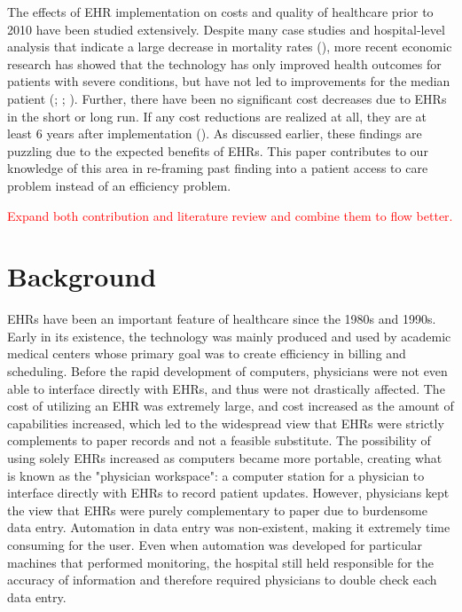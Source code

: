 \documentclass[11pt]{article}
\begin{document}
The effects of EHR implementation on costs and quality of healthcare prior to 2010 have been studied extensively. Despite many case studies and hospital-level analysis that indicate a large decrease in mortality rates (\cite{Buntin2011TheResults}), more recent economic research has showed that the technology has only improved health outcomes for patients with severe conditions, but have not led to improvements for the median patient (\cite{Agha2014TheCare}; \cite{McCullough2016HealthCoordination}; \cite{Meyerhoefer}). Further, there have been no significant cost decreases due to EHRs in the short or long run. If any cost reductions are realized at all, they are at least 6 years after implementation (\cite{dranove2014trillion}). As discussed earlier, these findings are puzzling due to the expected benefits of EHRs. This paper contributes to our knowledge of this area in re-framing past finding into a patient access to care problem instead of an efficiency problem.

\textcolor{red}{Expand both contribution and literature review and combine them to flow better.}


\newpage


\section{Background}

EHRs have been an important feature of healthcare since the 1980s and 1990s. Early in its existence, the technology was mainly produced and used by academic medical centers whose primary goal was to create efficiency in billing and scheduling. Before the rapid development of computers, physicians were not even able to interface directly with EHRs, and thus were not drastically affected. The cost of utilizing an EHR was extremely large, and cost increased as the amount of capabilities increased, which led to the widespread view that EHRs were strictly complements to paper records and not a feasible substitute. The possibility of using solely EHRs increased as computers became more portable, creating what is known as the "physician workspace": a computer station for a physician to interface directly with EHRs to record patient updates. However, physicians kept the view that EHRs were purely complementary to paper due to burdensome data entry. Automation in data entry was non-existent, making it extremely time consuming for the user. Even when automation was developed for particular machines that performed monitoring, the hospital still held responsible for the accuracy of information and therefore required physicians to double check each data entry. 
\end{document}
